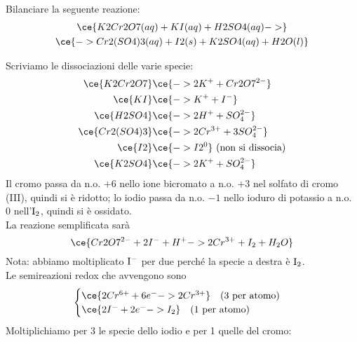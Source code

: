 \begin{esercizio}
    Bilanciare la seguente reazione:
    \begin{gather*}
        \ce{K2Cr2O7(aq) + KI(aq) + H2SO4(aq) ->}
        \\
        \ce{-> Cr2(SO4)3(aq) + I2(s) + K2SO4(aq) + H2O(l)}
    \end{gather*}
\end{esercizio}
\begin{soluzione}
    Scriviamo le dissociazioni delle varie specie:
    \begin{equation*}
        \begin{split}
            \ce{K2Cr2O7} & \ce{-> 2K^+ + Cr2O7^{2-}}
            \\
            \ce{KI} & \ce{-> K^+ + I^-}
            \\
            \ce{H2SO4} & \ce{-> 2H^+ + SO_4^{2-}}
            \\
            \ce{Cr2(SO4)3} & \ce{-> 2Cr^{3+} + 3SO_4^{2-}}
            \\
            \ce{I2} & \ce{-> I2^{0}} \text{ (non si dissocia)}
            \\
            \ce{K2SO4} & \ce{-> 2K^+ + SO_4^{2-}}
            \\
        \end{split}
    \end{equation*}
    Il cromo passa da n.o. $+6$ nello ione bicromato a n.o. $+3$ nel solfato di cromo (III), quindi si è ridotto; lo iodio passa da n.o. $-1$ nello ioduro di potassio a n.o. $0$ nell'$\rm I_2$, quindi si è ossidato.\\
    La reazione semplificata sarà
    \begin{equation*}
        \ce{Cr2O7^{2-} + 2I^- + H^+ -> 2Cr^{3+} + I_2 + H_2O}
    \end{equation*}
    Nota: abbiamo moltiplicato $\rm I^-$ per due perché la specie a destra è $\rm I_2$.\\
    Le semireazioni redox che avvengono sono
    \begin{equation*}
        \begin{cases}
            \ce{2Cr^{6+} + 6e^- -> 2Cr^{3+}} \quad (\text{3 per atomo})\\
            \ce{2I^- + 2e^- -> I_2} \quad (\text{1 per atomo})
        \end{cases}
    \end{equation*}
    Moltiplichiamo per 3 le specie dello iodio e per 1 quelle del cromo:
    \begin{equation*}

\end{equation*}
\end{soluzione}
